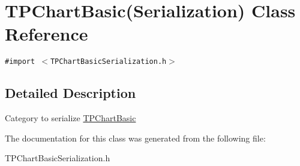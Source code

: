 \hypertarget{interface_t_p_chart_basic_07_serialization_08}{
\section{TPChartBasic(Serialization) Class Reference}
\label{interface_t_p_chart_basic_07_serialization_08}
}
{\tt \#import $<$TPChartBasicSerialization.h$>$}



\subsection{Detailed Description}
Category to serialize \hyperlink{interface_t_p_chart_basic}{TPChartBasic} 

The documentation for this class was generated from the following file:\begin{CompactItemize}
\item 
TPChartBasicSerialization.h\end{CompactItemize}
